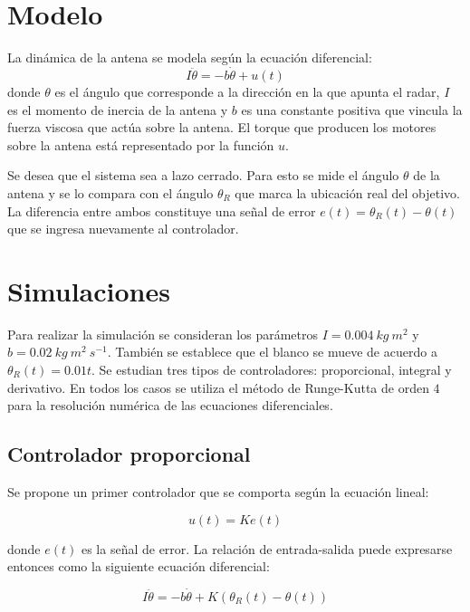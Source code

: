 \documentclass{sig-alternate}
\begin{document}
\section{Modelo}\label{modelo}
La din\'{a}mica de la antena se modela seg\'{u}n la ecuaci\'{o}n diferencial:
\begin{equation}
\label{dinamica_antena}
I \ddot\theta = - b \dot\theta + u(t)
\end{equation}
donde $\theta$ es el \'{a}ngulo que corresponde a la direcci\'{o}n en la que
apunta el radar, $I$ es el momento de inercia de la antena y $b$ es una 
constante positiva que vincula la fuerza viscosa que act\'{u}a sobre la antena.
El torque que producen los motores sobre la antena est\'{a} representado por 
la funci\'{o}n $u$.

Se desea que el sistema sea a lazo cerrado. Para esto se mide el \'{a}ngulo
$\theta$ de la antena y se lo compara con el \'{a}ngulo $\theta_{R}$ que marca
la ubicaci\'{o}n real del objetivo. La diferencia entre ambos constituye una
se\~{n}al de error $e(t) = \theta_{R}(t) - \theta(t)$ que se ingresa nuevamente 
al controlador.

\section{Simulaciones}\label{simulaciones}
Para realizar la simulaci\'{o}n se consideran los par\'{a}metros 
$I = 0.004\ kg\ m^{2}$ y $b = 0.02\ kg\  m^{2}\ s^{-1}$. Tambi\'{e}n se establece
que el blanco se mueve de acuerdo a $\theta_{R}(t) = 0.01 t$.
Se estudian tres tipos de controladores: proporcional, integral y derivativo.
En todos los casos se utiliza el m\'{e}todo de Runge-Kutta de orden $4$ para
la resoluci\'{o}n num\'{e}rica de las ecuaciones diferenciales.

\subsection{Controlador proporcional}\label{proporcional}
Se propone un primer controlador que se comporta seg\'{u}n la 
ecuaci\'{o}n lineal:

\begin{equation}
\label{error_modelo}
u(t) = K e(t)
\end{equation}

donde $e(t)$ es la se\~{n}al de error. La relaci\'{o}n de entrada-salida 
puede expresarse entonces como la siguiente ecuaci\'{o}n diferencial:

\begin{equation}
\label{ecuacion_modelo1}
I \ddot\theta = - b \dot\theta + K(\theta_R(t) - \theta(t))
\end{equation}
\end{document}
